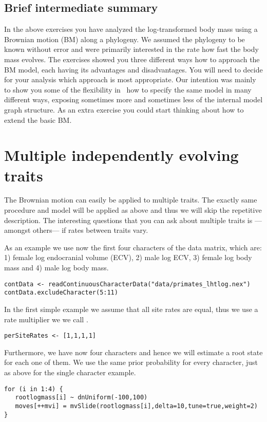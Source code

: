 \subsection{Brief intermediate summary}
In the above exercises you have analyzed the log-transformed body mass using a Brownian motion (BM) along a phylogeny. We assumed the phylogeny to be known without error and were primarily interested in the rate how fast the body mass evolves. The exercises showed you three different ways how to approach the BM model, each having its advantages and disadvantages. You will need to decide for your analysis which approach is most appropriate. Our intention was mainly to show you some of the flexibility in \RevBayes~how to specify the same model in many different ways, exposing sometimes more and sometimes less of the internal model graph structure. As an extra exercise you could start thinking about how to extend the basic BM.



\vspace{5cm}


\section{Multiple independently evolving traits}
The Brownian motion can easily be applied to multiple traits. The exactly same procedure and model will be applied as above and thus we will skip the repetitive description. The interesting questions that you can ask about multiple traits is ---amongst others--- if rates between traits vary.


As an example we use now the first four characters of the data matrix, which are: 1) female log endocranial volume (ECV), 2) male log ECV, 3) female log body mass and 4) male log body mass.
{\tt \small \begin{snugshade*}
\begin{lstlisting}
contData <- readContinuousCharacterData("data/primates_lhtlog.nex")
contData.excludeCharacter(5:11)
\end{lstlisting}
\end{snugshade*}}
In the first simple example we assume that all site rates are equal, thus we use a rate multiplier we we call .
{\tt \small \begin{snugshade*}
\begin{lstlisting}
perSiteRates <- [1,1,1,1]
\end{lstlisting}
\end{snugshade*}}
Furthermore, we have now four characters and hence we will estimate a root state for each one of them. We use the same prior probability for every character, just as above for the single character example.
{\tt \small \begin{snugshade*}
\begin{lstlisting}
for (i in 1:4) {
   rootlogmass[i] ~ dnUniform(-100,100)
   moves[++mvi] = mvSlide(rootlogmass[i],delta=10,tune=true,weight=2) 
}
\end{lstlisting}
\end{snugshade*}}


